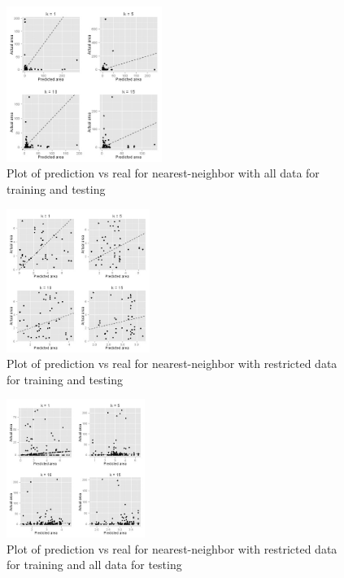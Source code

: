 \documentclass{article}
\begin{document}
\pagebreak

\begin{figure}[h]
  \centering
  \includegraphics[width=0.45\textwidth]{knn_good_whole.jpg}
  \caption{Plot of prediction vs real for nearest-neighbor with all data for
  training and testing}
  \label{fig:knn_whole}
\end{figure}

\begin{figure}[h]
  \centering
  \includegraphics[width=0.415\textwidth]{knn_good_own.jpg}
  \caption{Plot of prediction vs real for nearest-neighbor with restricted data
    for training and testing}
  \label{fig:knn_own}
\end{figure}

\pagebreak

\begin{figure}[h]
  \centering
  \includegraphics[width=0.4\textwidth]{knn_good_all.jpg}
  \caption{Plot of prediction vs real for nearest-neighbor with restricted data
    for training and all data for testing}
  \label{fig:knn_all}
\end{figure}
\end{document}

